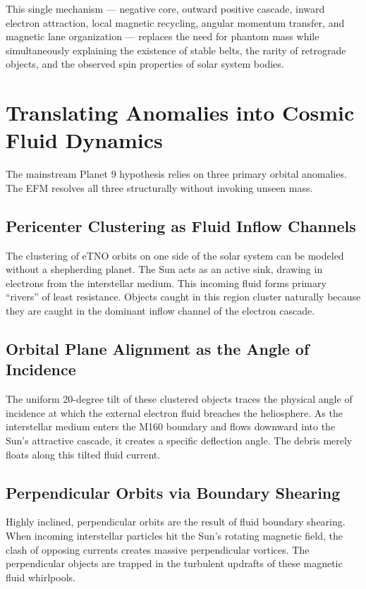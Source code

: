\documentclass[11pt, a4paper]{article}
\begin{document}
This single mechanism --- negative core, outward positive cascade, inward electron attraction, local magnetic recycling, angular momentum transfer, and magnetic lane organization --- replaces the need for phantom mass while simultaneously explaining the existence of stable belts, the rarity of retrograde objects, and the observed spin properties of solar system bodies.

\section{Translating Anomalies into Cosmic Fluid Dynamics}
The mainstream Planet 9 hypothesis \cite{trujillo2014, batygin2016} relies on three primary orbital anomalies. The EFM resolves all three structurally without invoking unseen mass.

\subsection{Pericenter Clustering as Fluid Inflow Channels}
The clustering of eTNO orbits on one side of the solar system can be modeled without a shepherding planet. The Sun acts as an active sink, drawing in electrons from the interstellar medium. This incoming fluid forms primary ``rivers'' of least resistance. Objects caught in this region cluster naturally because they are caught in the dominant inflow channel of the electron cascade.

\subsection{Orbital Plane Alignment as the Angle of Incidence}
The uniform 20-degree tilt of these clustered objects traces the physical angle of incidence at which the external electron fluid breaches the heliosphere. As the interstellar medium enters the M160 boundary and flows downward into the Sun's attractive cascade, it creates a specific deflection angle. The debris merely floats along this tilted fluid current.

\subsection{Perpendicular Orbits via Boundary Shearing}
Highly inclined, perpendicular orbits are the result of fluid boundary shearing. When incoming interstellar particles hit the Sun's rotating magnetic field, the clash of opposing currents creates massive perpendicular vortices. The perpendicular objects are trapped in the turbulent updrafts of these magnetic fluid whirlpools.
\end{document}
